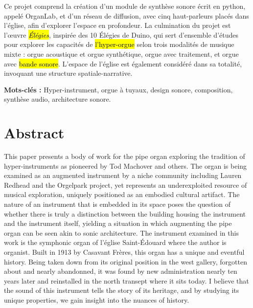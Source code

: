 \documentclass[12pt,twoside,maitrise]{dms_ks}
\theoremstyle{definition}
\begin{document}
Ce projet comprend la création d'un module de synthèse sonore écrit en python, appelé OrganLab, et d'un réseau de diffusion, avec cinq haut-parleurs placés dans l'église, afin d'explorer l'espace en profondeur. 
La culmination du projet est l'œuvre \hl{\textit{Élégies}}, inspirée des 10 Élégies de Duino, qui sert d'ensemble d'études pour explorer les capacités de \hl{l'hyper-orgue} selon trois modalités de musique mixte : orgue acoustique et orgue synthétique, orgue avec traitement, et orgue avec \hl{bande sonore}. 
L'espace de l'église est également considéré dans sa totalité, invoquant une structure spatiale-narrative. 

\textbf{Mots-clés :} Hyper-instrument, orgue à tuyaux, design sonore, composition, synthèse audio, architecture sonore.



\anglais

\chapter*{Abstract}

This paper presents a body of work for the pipe organ exploring the tradition of hyper-instruments as pioneered by Tod Machover and others. 
The organ is being examined as an augmented instrument by a niche community including Lauren Redhead and the Orgelpark project, yet represents an underexploited resource of musical exploration, uniquely positioned as an embodied cultural artifact. 
The nature of an instrument that is embedded in its space poses the question of whether there is truly a distinction between the building housing the instrument and the instrument itself, yielding a situation in which augmenting the pipe organ can be seen akin to sonic architecture. 
The instrument examined in this work is the symphonic organ of l'église Saint-Édouard where the author is organist. 
Built in 1913 by Casavant Frères, this organ has a unique and eventful history. 
Being taken down from its original position in the west gallery, forgotten about and nearly abandonned, it was found by new administration nearly ten years later and reinstalled in the north transept where it sits today. 
I believe that the sound of this instrument tells the story of its heritage, and by studying its unique properties, we gain insight into the nuances of history. 
\end{document}
